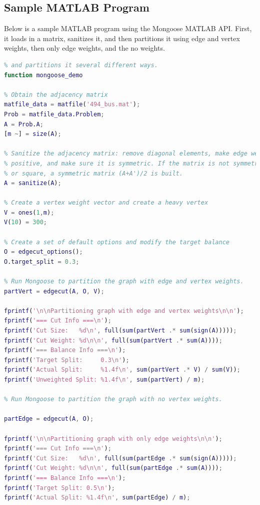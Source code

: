 \documentclass[letter]{article}
\begin{document}
\subsection{Sample MATLAB Program}

Below is a sample MATLAB program using the Mongoose MATLAB API. First, it loads in a matrix, sanitizes it, and then partitions it using edge and vertex weights, then only edge weights, and the no weights.

\begin{lstlisting}[language=MATLAB]
% A simple demo to demonstrate Mongoose. Reads in a matrix, sanitizes it,
% and partitions it several different ways.
function mongoose_demo

% Obtain the adjacency matrix
matfile_data = matfile('494_bus.mat');
Prob = matfile_data.Problem;
A = Prob.A;
[m ~] = size(A);

% Sanitize the adjacency matrix: remove diagonal elements, make edge weights 
% positive, and make sure it is symmetric. If the matrix is not symmetric 
% or square, a symmetric matrix (A+A')/2 is built.
A = sanitize(A);

% Create a vertex weight vector and create a heavy vertex
V = ones(1,m);
V(10) = 300;

% Create a set of default options and modify the target balance
O = edgecut_options();
O.target_split = 0.3;

% Run Mongoose to partition the graph with edge and vertex weights.
partVert = edgecut(A, O, V);

fprintf('\n\nPartitioning graph with edge and vertex weights\n\n');
fprintf('=== Cut Info ===\n');
fprintf('Cut Size:   %d\n', full(sum(partVert .* sum(sign(A)))));
fprintf('Cut Weight: %d\n\n', full(sum(partVert .* sum(A))));
fprintf('=== Balance Info ===\n');
fprintf('Target Split:     0.3\n');
fprintf('Actual Split:     %1.4f\n', sum(partVert .* V) / sum(V));
fprintf('Unweighted Split: %1.4f\n', sum(partVert) / m);

% Run Mongoose to partition the graph with no vertex weights.

partEdge = edgecut(A, O);

fprintf('\n\nPartitioning graph with only edge weights\n\n');
fprintf('=== Cut Info ===\n');
fprintf('Cut Size:   %d\n', full(sum(partEdge .* sum(sign(A)))));
fprintf('Cut Weight: %d\n\n', full(sum(partEdge .* sum(A))));
fprintf('=== Balance Info ===\n');
fprintf('Target Split: 0.5\n');
fprintf('Actual Split: %1.4f\n', sum(partEdge) / m);


\end{lstlisting}
\end{document}
